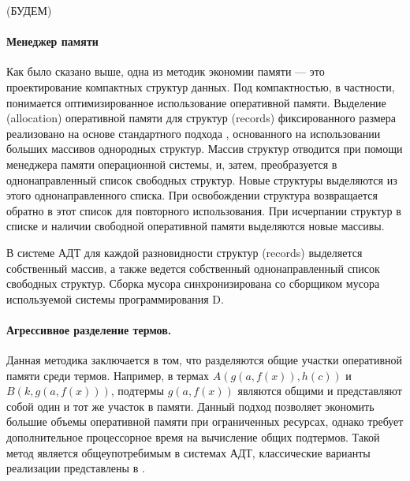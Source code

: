  (БУДЕМ)

\paragraph{Менеджер памяти}

Как было сказано выше, одна из методик экономии памяти --- это проектирование компактных структур данных. Под компактностью, в частности, понимается оптимизированное использование оперативной памяти. Выделение (allocation) оперативной памяти для структур (records) фиксированного размера реализовано на основе стандартного подхода \cite{}, основанного на использовании больших массивов однородных структур. Массив структур отводится при помощи менеджера памяти операционной системы, и, затем, преобразуется в однонаправленный список свободных структур. Новые структуры выделяются из этого однонаправленного списка. При освобождении структура возвращается обратно в этот список для повторного использования. При исчерпании структур в списке и наличии свободной оперативной памяти выделяются новые массивы.

В системе АДТ для каждой разновидности структур (records) выделяется собственный массив, а также ведется собственный однонаправленный список свободных структур. Сборка мусора синхронизирована со сборщиком мусора используемой системы программирования D.

\paragraph{Агрессивное разделение термов.} Данная методика заключается в том, что разделяются общие участки оперативной памяти среди термов. Например, в термах $A(g(a,f(x)),h(c))$ и $B(k,g(a,f(x)))$, подтермы $g(a,f(x))$ являются общими и представляют собой один и тот же участок в памяти. Данный подход позволяет экономить большие объемы оперативной памяти при ограниченных ресурсах, однако требует дополнительное процессорное время на вычисление общих подтермов. Такой метод является общеупотребимым в системах АДТ, классические варианты реализации представлены в \cite{}.

